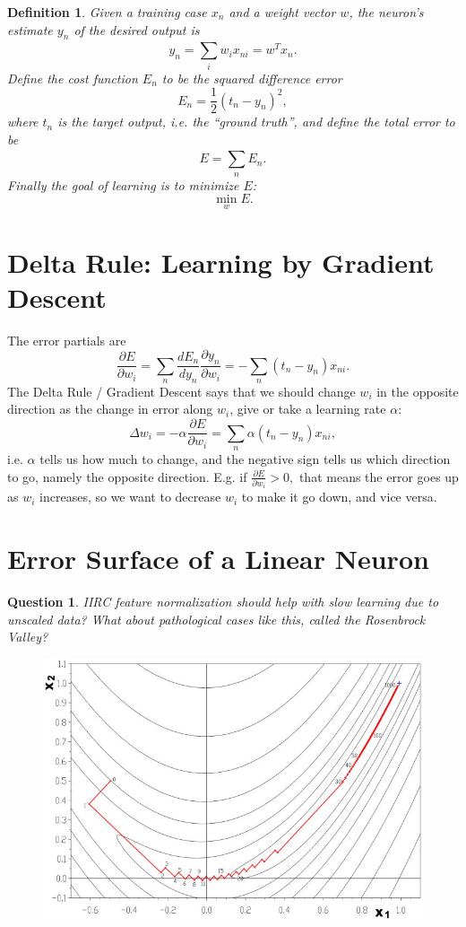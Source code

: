 \documentclass[12pt]{article}
\theoremstyle{plain}
\newtheorem{question}[theorem]{Question}
\newtheorem{definition}[theorem]{Definition}
\theoremstyle{definition}
\theoremstyle{remark}
\begin{document}
\begin{definition}
Given a training case $x_n$ and a weight vector $w$, the neuron's estimate $y_n$ of the desired output is $$y_n = \sum_{i}^{} w_i x_{ni} = w^T x_n.$$ Define the cost function $E_n$ to be the squared difference error $$E_n = \frac{1}{2}(t_n - y_n)^2,$$ where $t_n$ is the target output, i.e. the ``ground truth'', and define the total error to be $$E = \sum_{n}^{} E_n.$$ Finally the goal of learning is to minimize $E$: $$\min_{w} E.$$
\end{definition}

\section{Delta Rule: Learning by Gradient Descent}

The error partials are 
$$\frac{\partial E}{\partial w_i} = \sum_n \frac{dE_n}{dy_n} \frac{\partial y_n}{\partial w_i} = - \sum_n (t_n - y_n) x_{ni}.$$
The Delta Rule / Gradient Descent says that we should change $w_i$ in the opposite direction as the change in error along $w_i$, give or take a learning rate $\alpha$:
$$\Delta w_i = - \alpha \frac{\partial E}{\partial w_i} = \sum_n \alpha (t_n - y_n) x_{ni},$$ i.e. $\alpha$ tells us how much to change, and the negative sign tells us which direction to go, namely the opposite direction. E.g. if $\frac{\partial E}{\partial w_i} > 0,$ that means the error goes up as $w_i$ increases, so we want to decrease $w_i$ to make it go down, and vice versa.

\section{Error Surface of a Linear Neuron}

\begin{question}
IIRC feature normalization should help with slow learning due to unscaled data? What about pathological cases like this, called the Rosenbrock Valley?
\end{question}

\begin{figure}[H]
\centering
\includegraphics[width=1.0\textwidth]{slowlearrning}
\end{figure}
\end{document}
